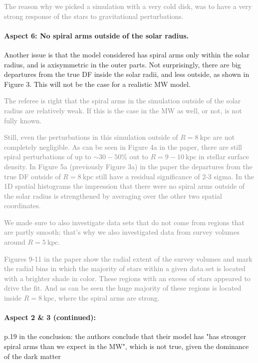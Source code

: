 \documentclass[10pt,a4paper]{article}
\newcommand{\Answer}[1]{\textcolor{Gray}{#1}}
\begin{document}
\Answer{The reason why we picked a simulation with a very cold disk, was to have a very strong response of the stars to gravitational perturbations.}

\paragraph{Aspect 6: No spiral arms outside of the solar radius.} Another issue is that the model considered has spiral arms only within the solar
radius, and is axisymmetric in the outer parts. Not surprisingly, there are big
departures from the true DF inside the solar radii, and less outside, as shown in
Figure 3. This will not be the case for a realistic MW model. 

\Answer{The referee is right that the spiral arms in the simulation outside of the solar radius are relatively weak. If this is the case in the MW as well, or not, is not fully known.}

\Answer{Still, even the perturbations in this simulation outside of $R=8~\text{kpc}$ are not completely negligible. As can be seen in Figure 4a in the paper, there are still spiral perturbations of up to $\sim30-50\%$ out to $R=9-10~\text{kpc}$ in stellar surface density. In Figure 5a (previously Figure 3a) in the paper the departures from the true DF outside of $R=8~\text{kpc}$ still have a residual significance of 2-3 sigma. In the 1D spatial histograms the impression that there were no spiral arms outside of the solar radius is strengthened by averaging over the other two spatial coordinates.}

\Answer{We made sure to also investigate data sets that do not come from regions that are partly smooth; that's why we also investigated data from survey volumes around $R=5~\text{kpc}$.}

\Answer{Figures 9-11 in the paper show the radial extent of the survey volumes and mark the radial bins in which the majority of stars within a given data set is located with a brighter shade in color. These regions with an excess of stars appeared to drive the fit. And as can be seen the huge majority of these regions is located inside $R=8~\text{kpc}$, where the spiral arms are strong.}

\paragraph{Aspect 2 \& 3 (continued):} p.19 in the conclusion: the authors conclude that their model has "has stronger spiral arms than we expect in the MW", which is not true, given the dominance of
the dark matter
\end{document}
